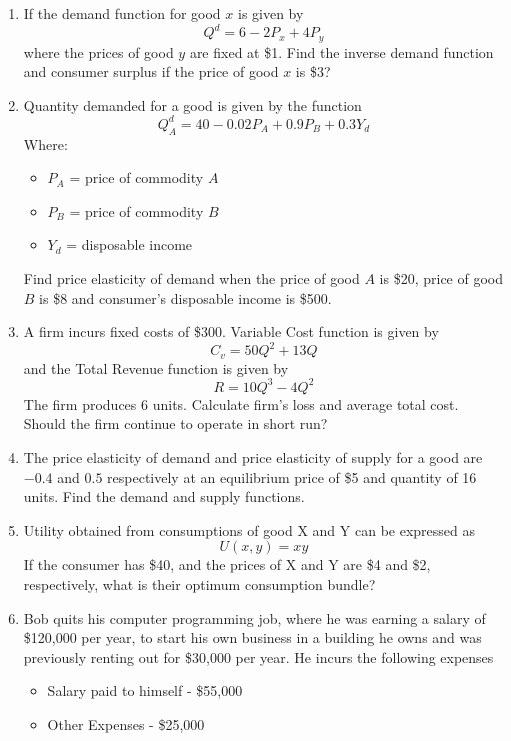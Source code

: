 \documentclass{article}
\begin{document}
\begin{enumerate}
    \item
        If the demand function for good $x$ is given by
        \[
        Q^d = 6 - 2P_x + 4P_y
        \]
        where the prices of good $y$ are fixed at \$1.
        Find the inverse demand function and consumer surplus if the price of good $x$ is \$3?
    \item 
        Quantity demanded for a good is given by the function
        \[
        Q_A^d = 40 - 0.02P_A + 0.9P_B + 0.3Y_d
        \]
        Where:
        \begin{itemize}
            \item $P_A$ = price of commodity $A$
            \item $P_B$ = price of commodity $B$
            \item $Y_d$ = disposable income 
        \end{itemize}
        Find price elasticity of demand when the price of good $A$ is \$20, price of good $B$ is \$8 and consumer's disposable income is \$500.
    \item 
        A firm incurs fixed costs of \$300. Variable Cost function is given by 
        \[
        C_v = 50Q^2 + 13Q
        \]
        and the Total Revenue function is given by
        \[
        R = 10Q^3 - 4Q^2
        \]
        The firm produces $6$ units. Calculate firm's loss and average total cost. Should the firm continue to operate in short run?
    \item 
        The price elasticity of demand and price elasticity of supply for a good are $-0.4$ and $0.5$ respectively at an equilibrium price of \$5 and quantity of 16 units. Find the demand and supply functions.  
    \item 
        Utility obtained from consumptions of good X and Y can be expressed as
        \[
        U(x,y) = xy
        \]
        If the consumer has \$40, and the prices of X and Y are \$4 and \$2, respectively, what is their optimum consumption bundle?
    \item 
        Bob quits his computer programming job, where he was earning a salary of \$120,000 per year, to start his own business in a building he owns and was previously renting out for \$30,000 per year. He incurs the following expenses
        \begin{itemize}
            \item Salary paid to himself - \$55,000
            \item Other Expenses - \$25,000

\end{itemize}
\end{enumerate}
\end{document}
